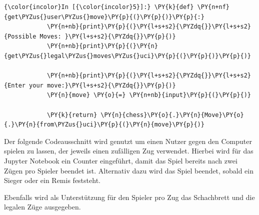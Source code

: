     \begin{Verbatim}[commandchars=\\\{\}]
{\color{incolor}In [{\color{incolor}5}]:} \PY{k}{def} \PY{n+nf}{get\PYZus{}user\PYZus{}move}\PY{p}{(}\PY{p}{)}\PY{p}{:}
            \PY{n+nb}{print}\PY{p}{(}\PY{l+s+s2}{\PYZdq{}}\PY{l+s+s2}{Possible Moves: }\PY{l+s+s2}{\PYZdq{}}\PY{p}{)}
            \PY{n+nb}{print}\PY{p}{(}\PY{n}{get\PYZus{}legal\PYZus{}moves\PYZus{}uci}\PY{p}{(}\PY{p}{)}\PY{p}{)}
            
            \PY{n+nb}{print}\PY{p}{(}\PY{l+s+s2}{\PYZdq{}}\PY{l+s+s2}{Enter your move:}\PY{l+s+s2}{\PYZdq{}}\PY{p}{)}
            \PY{n}{move} \PY{o}{=} \PY{n+nb}{input}\PY{p}{(}\PY{p}{)}
                
            \PY{k}{return} \PY{n}{chess}\PY{o}{.}\PY{n}{Move}\PY{o}{.}\PY{n}{from\PYZus{}uci}\PY{p}{(}\PY{n}{move}\PY{p}{)}
\end{Verbatim}


    Der folgende Codeausschnitt wird genutzt um einen Nutzer gegen den
Computer spielen zu lassen, der jeweils einen zufälligen Zug verwendet.
Hierbei wird für das Jupyter Notebook ein Counter eingeführt, damit das
Spiel bereits nach zwei Zügen pro Spieler beendet ist. Alternativ dazu
wird das Spiel beendet, sobald ein Sieger oder ein Remis feststeht.

Ebenfalls wird als Unterstützung für den Spieler pro Zug das Schachbrett
und die legalen Züge ausgegeben.

